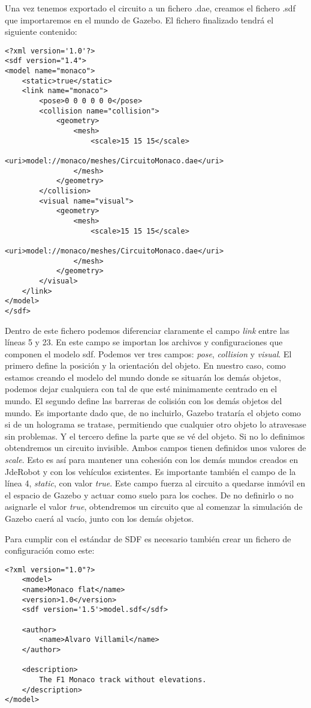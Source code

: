 Una vez tenemos exportado el circuito a un fichero .dae, creamos el fichero .sdf que importaremos en el mundo de Gazebo. El fichero finalizado tendrá el siguiente contenido:

\lstset{language=xml}
\begin{lstlisting}
<?xml version='1.0'?>
<sdf version="1.4">
<model name="monaco">
	<static>true</static>
	<link name="monaco">
		<pose>0 0 0 0 0 0</pose>
		<collision name="collision">
			<geometry>
				<mesh>
					<scale>15 15 15</scale>
					<uri>model://monaco/meshes/CircuitoMonaco.dae</uri>
				</mesh>
			</geometry>
		</collision>
		<visual name="visual">
			<geometry>
				<mesh>
					<scale>15 15 15</scale>
					<uri>model://monaco/meshes/CircuitoMonaco.dae</uri>
				</mesh>
			</geometry>
		</visual>
	</link>
</model>
</sdf>
\end{lstlisting}

Dentro de este fichero podemos diferenciar claramente el campo \textit{link} entre las líneas 5 y 23. En este campo se importan los archivos y configuraciones que componen el modelo sdf. Podemos ver tres campos: \textit{pose}, \textit{collision} y \textit{visual}. El primero define la posición y la orientación del objeto. En nuestro caso, como estamos creando el modelo del mundo donde se situarán los demás objetos, podemos dejar cualquiera con tal de que esté minimamente centrado en el mundo. El segundo define las barreras de colisión con los demás objetos del mundo. Es importante dado que, de no incluirlo, Gazebo trataría el objeto como si de un holograma se tratase, permitiendo que cualquier otro objeto lo atravesase sin problemas. Y el tercero define la parte que se vé del objeto. Si no lo definimos obtendremos un circuito invisible. Ambos campos tienen definidos unos valores de \textit{scale}. Esto es así para mantener una cohesión con los demás mundos creados en JdeRobot y con los vehículos existentes. Es importante también el campo de la línea 4, \textit{static}, con valor \textit{true}. Este campo fuerza al circuito a quedarse inmóvil en el espacio de Gazebo y actuar como suelo para los coches. De no definirlo o no asignarle el valor \textit{true}, obtendremos un circuito que al comenzar la simulación de Gazebo caerá al vacío, junto con los demás objetos.

Para cumplir con el estándar de SDF es necesario también crear un fichero de configuración como este:
\lstset{language=xml}
\begin{lstlisting}
<?xml version="1.0"?>
	<model>
	<name>Monaco flat</name>
	<version>1.0</version>
	<sdf version='1.5'>model.sdf</sdf>

	<author>
		<name>Alvaro Villamil</name>
	</author>

	<description>
		The F1 Monaco track without elevations.
	</description>
</model>
\end{lstlisting}

